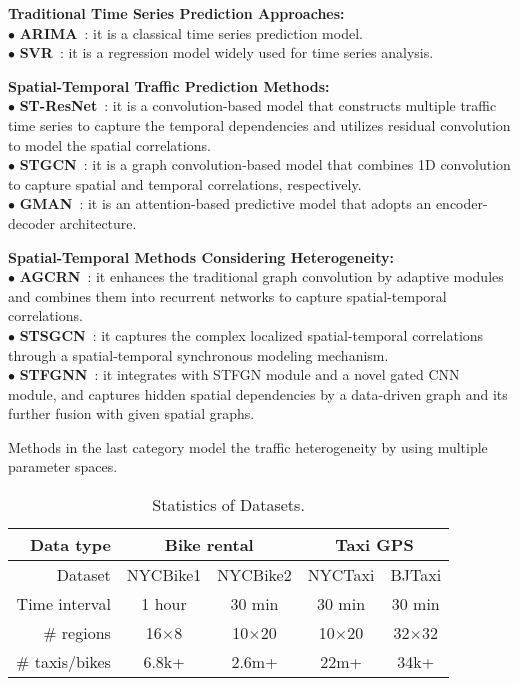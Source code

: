 \documentclass[letterpaper]{article} \usepackage{aaai23}  \usepackage{times}  \usepackage{helvet}  \usepackage{courier}  \usepackage[hyphens]{url}  \usepackage{graphicx} \urlstyle{rm} \def\UrlFont{\rm}  \usepackage{natbib}  \usepackage{caption} \frenchspacing  \setlength{\pdfpagewidth}{8.5in} \setlength{\pdfpageheight}{11in}
\newcommand{\bitem}[1]{\noindent$\bullet$ \textbf{#1}}
\begin{document}
{\bf \noindent Traditional Time Series Prediction Approaches:}\\
\bitem{ARIMA}~\cite{kumar2015short}: it is a
classical time series prediction model.\\
\bitem{SVR}~\cite{castro2009online}: it is a regression model widely used for time series analysis.\\\vspace{-0.12in}

{\bf \noindent Spatial-Temporal Traffic Prediction Methods:}\\
\bitem{ST-ResNet}~\cite{zhang2017deep}: it is a convolution-based model that constructs multiple traffic time series to capture the temporal dependencies and utilizes residual convolution to model the spatial correlations.\\
\bitem{STGCN}~\cite{yu2018spatio}: it is a graph convolution-based model that combines 1D convolution to capture spatial and temporal correlations, respectively.\\
\bitem{GMAN}~\cite{zheng2020gman}: it is an attention-based predictive model that adopts an encoder-decoder architecture.\\\vspace{-0.12in}

{\bf \noindent Spatial-Temporal Methods Considering Heterogeneity:}\\
\bitem{AGCRN}~\cite{bai2020adaptive}: it enhances the traditional graph convolution by adaptive modules and combines them into recurrent networks to capture spatial-temporal correlations.\\
\bitem{STSGCN}~\cite{song2020spatial}: it captures the complex localized spatial-temporal correlations through a spatial-temporal synchronous modeling mechanism.\\
\bitem{STFGNN}~\cite{li2021spatial}: it integrates with STFGN module and a novel gated CNN module, and captures hidden spatial dependencies by a data-driven graph and its further fusion with given spatial graphs.

Methods in the last category model the traffic heterogeneity by using multiple parameter spaces.



\begin{table}[t]\small
    \centering
    \setlength{\tabcolsep}{1.5mm}
    \begin{tabular}{rcccc}
      \toprule 
      {Data type} & \multicolumn{2}{c}{Bike rental} & \multicolumn{2}{c}{Taxi GPS} \\
      \midrule
      Dataset & NYCBike1 & NYCBike2 & NYCTaxi & BJTaxi \\
      Time interval & 1 hour & 30 min & 30 min & 30 min \\
      \# regions & 16$\times$8 & 10$\times$20 & 10$\times$20 & 32$\times$32 \\
      \# taxis/bikes & 6.8k+ & 2.6m+ & 22m+ & 34k+ \\
      \bottomrule
    \end{tabular}\caption{Statistics of Datasets.}\vspace{-.3cm}
    \label{tab:dataset}\end{table}
\end{document}
